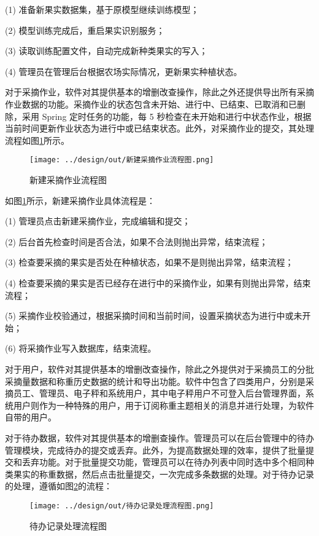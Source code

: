 (1) 准备新果实数据集，基于原模型继续训练模型；

(2) 模型训练完成后，重启果实识别服务；

(3) 读取训练配置文件，自动完成新种类果实的写入；

(4) 管理员在管理后台根据农场实际情况，更新果实种植状态。

对于采摘作业，软件对其提供基本的增删改查操作，除此之外还提供导出所有采摘作业数据的功能。采摘作业的状态包含未开始、进行中、已结束、已取消和已删除，采用 Spring 定时任务的功能，每 5 秒检查在未开始和进行中状态作业，根据当前时间更新作业状态为进行中或已结束状态。此外，对采摘作业的提交，其处理流程如图\ref{fig:新建采摘作业流程图}所示。

\begin{figure}[H]
    \centering
    \texttt{[image: ../design/out/新建采摘作业流程图.png]}
    \caption{新建采摘作业流程图}
    \label{fig:新建采摘作业流程图}
\end{figure}

如图\ref{fig:新建采摘作业流程图}所示，新建采摘作业具体流程是：

(1) 管理员点击新建采摘作业，完成编辑和提交；

(2) 后台首先检查时间是否合法，如果不合法则抛出异常，结束流程；

(3) 检查要采摘的果实是否处在种植状态，如果不是则抛出异常，结束流程；

(4) 检查要采摘的果实是否已经存在进行中的采摘作业，如果有则抛出异常，结束流程；

(5) 采摘作业校验通过，根据采摘时间和当前时间，设置采摘状态为进行中或未开始；

(6) 将采摘作业写入数据库，结束流程。

对于用户，软件对其提供基本的增删改查操作，除此之外提供对于采摘员工的分批采摘量数据和称重历史数据的统计和导出功能。软件中包含了四类用户，分别是采摘员工、管理员、电子秤和系统用户，其中电子秤用户不可登入后台管理界面，系统用户则作为一种特殊的用户，用于订阅称重主题相关的消息并进行处理，为软件自带的用户。

对于待办数据，软件对其提供基本的增删查操作。管理员可以在后台管理中的待办管理模块，完成待办的提交或丢弃。此外，为提高数据处理的效率，提供了批量提交和丢弃功能。对于批量提交功能，管理员可以在待办列表中同时选中多个相同种类果实的称重数据，然后点击批量提交，一次完成多条数据的处理。对于待办记录的处理，遵循如图\ref{fig:待办记录处理流程图}的流程：

\begin{figure}[H]
    \centering
    \texttt{[image: ../design/out/待办记录处理流程图.png]}
    \caption{待办记录处理流程图}
    \label{fig:待办记录处理流程图}
\end{figure}

